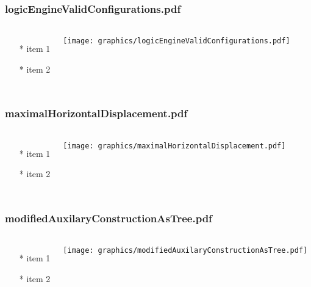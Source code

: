 \begin{frame} \frametitle{logicEngineValidConfigurations.pdf}
    \begin{columns}[c]
        \begin{itemize}
            \item[*] item 1
            \item[*] item 2
        \end{itemize}
        \begin{minipage}{\linewidth}
            \begin{center}
            \texttt{[image: graphics/logicEngineValidConfigurations.pdf]}
            \label{gfx:logicEngineValidConfigurations.pdf}
            \end{center}
        \end{minipage}
    \end{columns}
\end{frame}
\begin{frame} \frametitle{maximalHorizontalDisplacement.pdf}
    \begin{columns}[c]
        \begin{itemize}
            \item[*] item 1
            \item[*] item 2
        \end{itemize}
        \begin{minipage}{\linewidth}
            \begin{center}
            \texttt{[image: graphics/maximalHorizontalDisplacement.pdf]}
            \label{gfx:maximalHorizontalDisplacement.pdf}
            \end{center}
        \end{minipage}
    \end{columns}
\end{frame}
\begin{frame} \frametitle{modifiedAuxilaryConstructionAsTree.pdf}
    \begin{columns}[c]
        \begin{itemize}
            \item[*] item 1
            \item[*] item 2
        \end{itemize}
        \begin{minipage}{\linewidth}
            \begin{center}
            \texttt{[image: graphics/modifiedAuxilaryConstructionAsTree.pdf]}
            \label{gfx:modifiedAuxilaryConstructionAsTree.pdf}
            \end{center}
        \end{minipage}
    \end{columns}
\end{frame}
